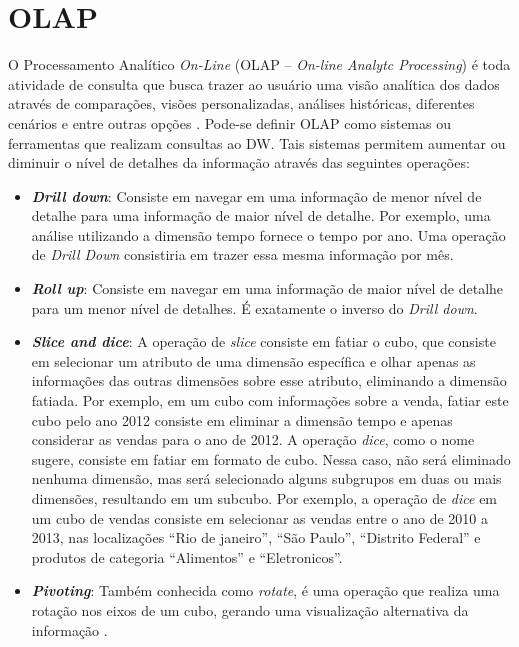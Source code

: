 \section{OLAP}
\label{sec-olap}

%

O Processamento Analítico \emph{On-Line} (OLAP – \emph{On-line Analytc Processing}) é toda atividade de consulta que busca trazer ao usuário uma visão analítica dos dados através de comparações, visões personalizadas, análises históricas, diferentes cenários e entre outras opções \cite{kimball2002}. Pode-se definir OLAP como sistemas ou ferramentas que realizam consultas ao DW. Tais sistemas permitem aumentar ou diminuir o nível de detalhes da informação através das seguintes operações:

%

\begin{itemize}
	\item \textbf{\emph{Drill down}}: Consiste em navegar em uma informação de menor nível de detalhe para uma informação de maior nível de detalhe. Por exemplo, uma análise utilizando a dimensão tempo fornece o tempo por ano. Uma operação de \emph{Drill Down} consistiria em trazer essa mesma informação por mês.
	\item \textbf{\emph{Roll up}}: Consiste em navegar em uma informação de maior nível de detalhe para um menor nível de detalhes. É exatamente o inverso do \emph{Drill down}.
	\item \textbf{\emph{Slice and dice}}: A operação de \emph{slice} consiste em fatiar o cubo, que consiste em selecionar um atributo de uma dimensão específica e olhar apenas as informações das outras dimensões sobre esse atributo, eliminando a dimensão fatiada. Por exemplo, em um cubo com informações sobre a venda, fatiar este cubo pelo ano 2012 consiste em eliminar a dimensão tempo e apenas considerar as vendas para o ano de 2012. A operação \emph{dice}, como o nome sugere, consiste em fatiar em formato de cubo. Nessa caso, não será eliminado nenhuma dimensão, mas será selecionado alguns subgrupos em duas ou mais dimensões, resultando em um subcubo. Por exemplo,  a operação de \emph{dice} em um cubo de vendas consiste em selecionar as vendas entre o ano de 2010 a 2013, nas localizações “Rio de janeiro”, “São Paulo”, “Distrito Federal” e produtos de categoria “Alimentos” e “Eletronicos”.
	\item \textbf{\emph{Pivoting}}: Também conhecida como \emph{rotate}, é uma operação que realiza uma rotação nos eixos de um cubo, gerando uma visualização alternativa da informação \cite{cavalcanti2012}. 
\end{itemize}


